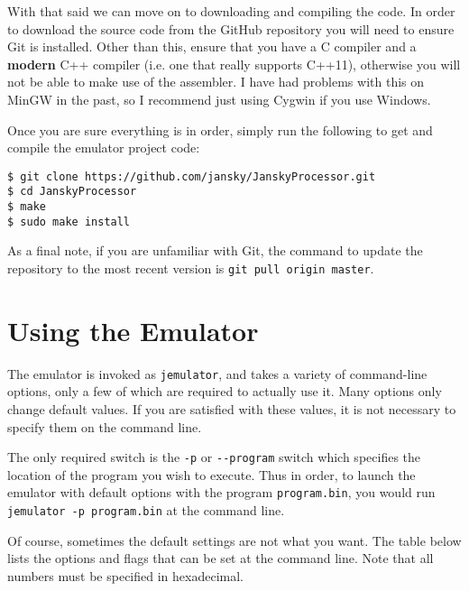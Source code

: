 \documentclass[12pt,letterpaper,titlepage,twoside]{book}
\begin{document}
With that said we can move on to downloading and compiling the code. In order to download the source code from the GitHub repository you will need to ensure Git is installed. Other than this, ensure that you have a C compiler and a \textbf{modern} C++ compiler (i.e. one that really supports C++11), otherwise you will not be able to make use of the assembler. I have had problems with this on MinGW in the past, so I recommend just using Cygwin if you use Windows.

Once you are sure everything is in order, simply run the following to get and compile the emulator project code:

\begin{verbatim}
$ git clone https://github.com/jansky/JanskyProcessor.git
$ cd JanskyProcessor
$ make
$ sudo make install
\end{verbatim}

As a final note, if you are unfamiliar with Git, the command to update the repository to the most recent version is \verb|git pull origin master|.
\section{Using the Emulator}
The emulator is invoked as \verb|jemulator|, and takes a variety of command-line options, only a few of which are required to actually use it. Many options only change default values. If you are satisfied with these values, it is not necessary to specify them on the command line.

The only required switch is the \verb|-p| or \verb|--program| switch which specifies the location of the program you wish to execute. Thus in order, to launch the emulator with default options with the program \verb|program.bin|, you would run \verb|jemulator -p program.bin| at the command line.

Of course, sometimes the default settings are not what you want. The table below lists the options and flags that can be set at the command line. Note that all numbers must be specified in hexadecimal.
\end{document}
